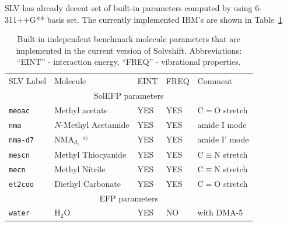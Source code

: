\documentclass[b5paper,oneside,fleqn,11pt]{book}
\begin{document}
\begin{refsection}
SLV has already decent set of built-in parameters computed 
by using 6-311++G** basis set. The currently implemented IBM's
are shown in Table~\ref{t:slv-ibm-buitin}
%
\begin{landscape}
\begin{longtable}{ p{} p{} p{} p{} p{} }
\caption{
Built-in independent benchmark molecule parameters that are implemented
in the current version of {\sc Solvshift}. Abbreviations: ``EINT'' - interaction
energy, ``FREQ'' - vibrational properties.
\label{t:slv-ibm-buitin}}
\\\hline\hline
 SLV Label             & Molecule                        & EINT &   FREQ   &     Comment                              \\
\multicolumn{5}{c}{SolEFP parameters} \\                                                           
\hline                                                                      
 \tt{meoac           } & Methyl acetate                  & YES  &   YES    &     C$=$O stretch                        \\ 
 \tt{nma             } & $N$-Methyl Acetamide            & YES  &   YES    &     amide I mode                         \\
 \tt{nma-d7          } & NMA$_{d_7}$ $^{a)}$             & YES  &   YES    &     amide I' mode                        \\
 \tt{mescn           } & Methyl Thiocyanide              & YES  &   YES    &     C$\equiv$N stretch                   \\
 \tt{mecn            } & Methyl Nitrile                  & YES  &   YES    &     C$\equiv$N stretch                   \\
 \tt{et2coo          } & Diethyl Carbonate               & YES  &   YES    &     C$=$O stretch                        \\
\multicolumn{5}{c}{EFP parameters} \\                                                                                   
\hline                                                                                                                  
 \tt{water           } & H$_2$O                          & YES  &   NO     &     with DMA-5                           \\

\end{longtable}
\end{landscape}
\end{refsection}
\end{document}
